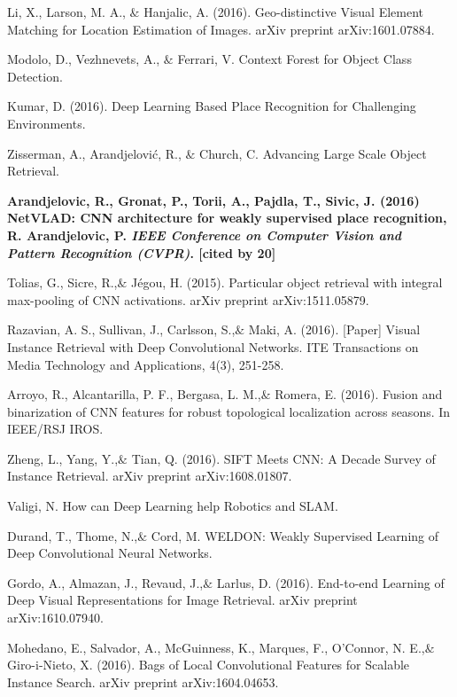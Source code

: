 \noindent
Li, X., Larson, M. A., $\&$ Hanjalic, A. (2016). Geo-distinctive Visual Element Matching for Location Estimation of Images. arXiv preprint arXiv:1601.07884.



\noindent
Modolo, D., Vezhnevets, A., $\&$ Ferrari, V. Context Forest for Object Class Detection.


\noindent
Kumar, D. (2016). Deep Learning Based Place Recognition for Challenging Environments.

\noindent
Zisserman, A., Arandjelović, R., $\&$ Church, C. Advancing Large Scale Object Retrieval.










\vfill
\newpage

\noindent
\textbf{
	Arandjelovic, R., Gronat, P., Torii, A., Pajdla, T., Sivic, J. (2016) 
	NetVLAD: CNN architecture for weakly supervised place recognition, R. Arandjelovic, P.
	\textit{IEEE Conference on Computer Vision and Pattern Recognition (CVPR)}.
	[cited by 20]
}

\noindent
Tolias, G., Sicre, R.,$\&$ Jégou, H. (2015). Particular object retrieval with integral max-pooling of CNN activations. arXiv preprint arXiv:1511.05879.


\noindent
Razavian, A. S., Sullivan, J., Carlsson, S.,$\&$ Maki, A. (2016). [Paper] Visual Instance Retrieval with Deep Convolutional Networks. ITE Transactions on Media Technology and Applications, 4(3), 251-258.

\noindent
Arroyo, R., Alcantarilla, P. F., Bergasa, L. M.,$\&$ Romera, E. (2016). Fusion and binarization of CNN features for robust topological localization across seasons. In IEEE/RSJ IROS.


\noindent
Zheng, L., Yang, Y.,$\&$ Tian, Q. (2016). SIFT Meets CNN: A Decade Survey of Instance Retrieval. arXiv preprint arXiv:1608.01807.

\noindent
Valigi, N. How can Deep Learning help Robotics and SLAM.

\noindent
Durand, T., Thome, N.,$\&$ Cord, M. WELDON: Weakly Supervised Learning of Deep Convolutional Neural Networks.

\noindent
Gordo, A., Almazan, J., Revaud, J.,$\&$ Larlus, D. (2016). End-to-end Learning of Deep Visual Representations for Image Retrieval. arXiv preprint arXiv:1610.07940.

\noindent
Mohedano, E., Salvador, A., McGuinness, K., Marques, F., O'Connor, N. E.,$\&$ Giro-i-Nieto, X. (2016). Bags of Local Convolutional Features for Scalable Instance Search. arXiv preprint arXiv:1604.04653.

